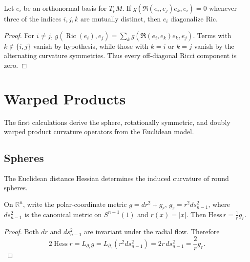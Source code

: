\begin{proposition}
  \label{prop:pet-ch4-ricci-diagonal-criterion}
  \leanok
  Let $e_i$ be an orthonormal basis for $T_pM$. If $g(\mathfrak{R}(e_i,e_j)e_k,e_i)=0$
  whenever three of the indices $i,j,k$ are mutually distinct, then $e_i$
  diagonalize $\mathrm{Ric}$.
\end{proposition}
\begin{proof}
  \leanok
  \sketch
  For $i\ne j$,
  $g(\operatorname{Ric}(e_i),e_j)=\sum_k g(\mathfrak R(e_i,e_k)e_k,e_j)$.
  Terms with $k\notin\{i,j\}$ vanish by hypothesis, while those with $k=i$ or
  $k=j$ vanish by the alternating curvature symmetries. Thus every off-diagonal
  Ricci component is zero.
\end{proof}

\section{Warped Products}

The first calculations derive the sphere, rotationally symmetric, and doubly warped
product curvature operators from the Euclidean model.

\subsection{Spheres}

The Euclidean distance Hessian determines the induced curvature of round spheres.

\begin{proposition}
  \label{prop:pet-ch4-hess-r-euclidean}
  On $\mathbb{R}^n$, write the polar-coordinate metric $g=dr^2+g_r$, $g_r=r^2ds_{n-1}^2$,
  where $ds_{n-1}^2$ is the canonical metric on $S^{n-1}(1)$ and $r(x)=|x|$. Then
  $\mathrm{Hess}\,r=\tfrac1r g_r$.
\end{proposition}
\begin{proof}
  \sketch
  Both $dr$ and $ds_{n-1}^2$ are invariant under the radial flow. Therefore
  \[
    2\operatorname{Hess}r=L_{\partial_r}g
    =L_{\partial_r}(r^2ds_{n-1}^2)
    =2r\,ds_{n-1}^2=\frac2r g_r.
  \]
\end{proof}

